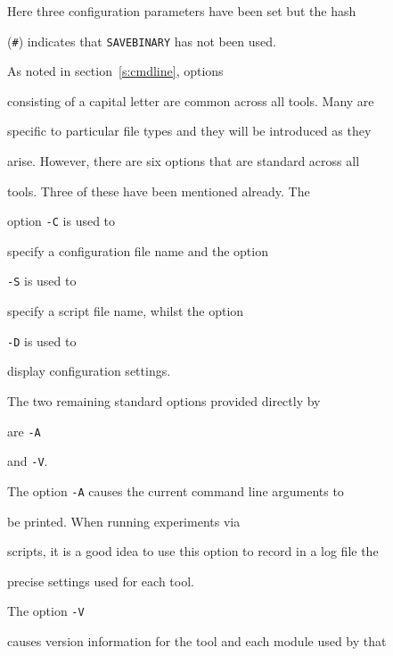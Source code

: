 Here three configuration parameters have been set but the hash


(\verb+#+) indicates that \texttt{SAVEBINARY} has not been used.














 As noted in section~\ref{s:cmdline}, options


consisting of a capital letter are common across all tools.  Many are


specific to particular file types and they will be introduced as they


arise.  However, there are six options that are standard across all


tools.  Three of these have been mentioned already.  The


option \texttt{-C} is used to


specify a configuration file name and the option


\texttt{-S} is used to


specify a script file name, whilst the option


\texttt{-D} is used to


display configuration settings.





The two remaining standard options provided directly by 


 are \texttt{-A}


and \texttt{-V}. 


The option \texttt{-A} causes the current command line arguments to 


be printed. When running experiments via


scripts, it is a good idea to use this option to record in a log file the


precise settings used for each tool.


The option \texttt{-V}


causes version information for the tool and each module used by that


